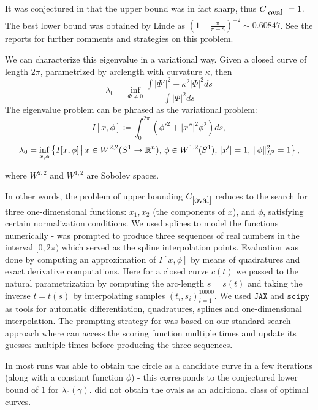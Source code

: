 It was conjectured in \cite{bengurialoss} that the upper bound was in fact sharp, thus $C_{\ref{oval}}=1$.  The best lower bound was obtained by Linde \cite{linde2006lower} as $(1 + \frac{\pi}{\pi+8})^{-2} \sim 0.60847$. See the reports \cite{aim2006problems,mfo2009report} for further comments and strategies on this problem.

We can characterize this eigenvalue in a variational way. Given a closed curve of length $2\pi$, parametrized by arclength with curvature $\kappa$, then 
\[
\lambda_0 = \inf_{\Phi \neq 0} \frac{\int |\Phi'|^2 + \kappa^2 |\Phi|^2 ds}{\int |\Phi|^2 ds}
\]
The eigenvalue problem can be phrased as the variational problem:
\begin{equation}
    I[x, \phi] \coloneqq \int_0^{2\pi} \left( \phi'^2 + |x''|^2 \phi^2 \right) ds,
\end{equation}
\[
    \lambda_0 = \inf_{x,\phi} \left\{ I[x, \phi] \, \middle| \, x \in W^{2,2}(S^1 \to \mathbb{R}^n), \, \phi \in W^{1,2}(S^1), \, |x'| = 1, \, \|\phi\|_{L^2}^2 = 1 \right\},
\]

where $W^{2,2}$ and $W^{1,2}$ are Sobolev spaces. 

In other words, the problem of upper bounding $C_{\ref{oval}}$ reduces to the search for three one-dimensional functions: $x_1, x_2$ (the components of $x$), and $\phi$, satisfying certain normalization conditions. We used splines to model the functions numerically -  \AlphaEvolve was prompted to produce three sequences of real numbers in the interval $[0, 2\pi)$ which served as the spline interpolation points. Evaluation was done by computing an approximation of $I[x, \phi]$ by means of quadratures and exact derivative computations. Here for a closed curve $c(t)$ we passed to the natural parametrization by computing the arc-length $s = s(t)$ and taking the inverse $t = t(s)$ by interpolating samples $(t_i, s_i)_{i=1}^{10000}$. We used $\texttt{JAX}$ and $\texttt{scipy}$ as tools for automatic differentiation, quadratures, splines and one-dimensional interpolation. The prompting strategy for \AlphaEvolve was based on our standard search approach where \AlphaEvolve can access the scoring function multiple times and update its guesses multiple times before producing the three sequences.  

In most runs \AlphaEvolve was able to obtain the circle as a candidate curve in a few iterations (along with a constant function $\phi$) - this corresponds to the conjectured lower bound of $1$ for $\lambda_0(\gamma)$. \AlphaEvolve did not obtain the ovals as an additional class of optimal curves.

